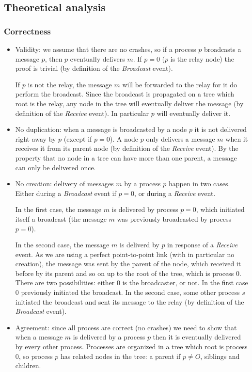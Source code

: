\documentclass[a4paper]{article}
\begin{document}
\subsection{Theoretical analysis}
\subsubsection*{Correctness}
\begin{itemize}
    \item Validity: we assume that there are no crashes, so if a process $p$
        broadcasts a message $p$, then $p$ eventually delivers $m$. If $p = 0$
        ($p$ is the relay node) the proof is trivial (by definition of the
        \textit{Broadcast} event).

        If $p$ is not the relay, the message $m$ will be forwarded to the
        relay for it do perform the broadcast. Since the broadcast is
        propagated on a tree which root is the relay, any node in the tree
        will eventually deliver the message (by definition of the
        \textit{Receive} event). In particular $p$ will eventually deliver it.
    \item No duplication: when a message is broadcasted by a node $p$ it is not
        delivered right away by $p$ (except if $p = 0$). A node $p$ only
        delivers a message $m$ when it receives it from its parent node (by
        definition of the \textit{Receive} event). By the property that no
        node in a tree can have more than one parent, a message can only be
        delivered once.
    \item No creation: delivery of messages $m$ by a process $p$ happen in two
        cases. Either during a \textit{Broadcast} event if $p=0$, or during a
        \textit{Receive} event.

        In the first case, the message $m$ is delivered by process $p=0$, which
        initiated itself a broadcast (the message $m$ was previously
        broadcasted by process $p=0$).

        In the second case, the message $m$ is deliverd by $p$ in response of
        a \textit{Receive} event. As we are using a perfect point-to-point
        link (with in particular no creation), the message was sent by the
        parent of the node, which received it before by its parent and so on
        up to the root of the tree, which is process $0$. There are two
        possibilities: either $0$ is the broadcaster, or not. In the first
        case $0$ previously initiated the broadcast. In the second case, some
        other process $s$ initiated the broadcast and sent its message to the
        relay (by definition of the \textit{Broadcast} event).
    \item Agreement: since all process are correct (no crashes) we need to
        show that when a message $m$ is delivered by a process $p$ then it is
        eventually delivered by every other process. Processes are organized
        in a tree which root is process $0$, so process $p$ has related nodes
        in the tree: a parent if $p \neq O$, siblings and children.


\end{itemize}
\end{document}
